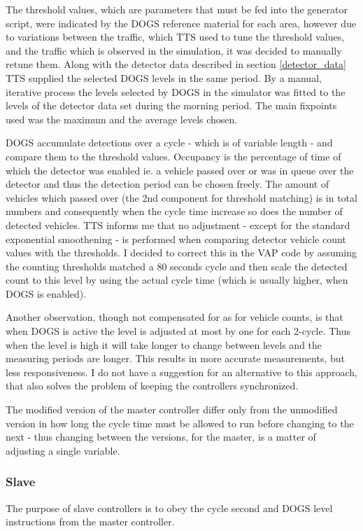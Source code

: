 The threshold values, which are parameters that must be fed into the generator script, were indicated by the DOGS reference material for each area, however due to variations between the traffic, which TTS used to tune the threshold values, and the traffic which is observed in the simulation, it was decided to manually retune them. 
Along with the detector data described in section \ref{detector_data} TTS supplied the selected DOGS levels in the same period. By a manual, iterative process the levels selected by DOGS in the simulator was fitted to the levels of the detector data set during the morning period. The main fixpoints used was the maximum and the average levels chosen.

DOGS accumulate detections over a cycle - which is of variable length - and compare them to the threshold values. Occupancy is the percentage of time of which the detector was enabled ie. a vehicle passed over or was in queue over the detector and thus the detection period can be chosen freely. The amount of vehicles which passed over (the 2nd component for threshold matching) is in total numbers and consequently when the cycle time increase so does the number of detected vehicles. TTS informs me that no adjustment - except for the standard exponential smoothening - is performed when comparing detector vehicle count values with the thresholds. I decided to correct this in the VAP code by assuming the counting thresholds matched a 80 seconds cycle and then scale the detected count to this level by using the actual cycle time (which is usually higher, when DOGS is enabled).

Another observation, though not compensated for as for vehicle counts, is that when DOGS is active the level is adjusted at most by one for each 2-cycle. Thus when the level is high it will take longer to change between levels and the measuring periods are longer. This results in more accurate measurements, but less responsiveness. I do not have a suggestion for an alternative to this approach, that also solves the problem of keeping the controllers synchronized.

The modified version of the master controller differ only from the unmodified version in how long the cycle time must be allowed to run before changing to the next - thus changing between the versions, for the master, is a matter of adjusting a single variable.

\subsubsection{Slave}
The purpose of slave controllers is to obey the cycle second and DOGS level instructions from the master controller.

